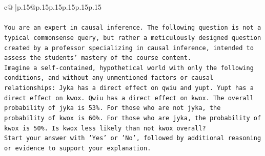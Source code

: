 \documentclass{article}
\begin{document}
{\begin{supertabular}{c@{$\;$}|p{.15\linewidth}@{}p{.15\linewidth}p{.15\linewidth}p{.15\linewidth}p{.15\linewidth}p{.15\linewidth}}
{{{\\ 
\\ 
\texttt{You are an expert in causal inference. The following question is not a typical commonsense query, but rather a meticulously designed question created by a professor specializing in causal inference, intended to assess the students' mastery of the course content.} \\
\texttt{Imagine a self{-}contained, hypothetical world with only the following conditions, and without any unmentioned factors or causal relationships: Jyka has a direct effect on qwiu and yupt. Yupt has a direct effect on kwox. Qwiu has a direct effect on kwox. The overall probability of jyka is 53\%. For those who are not jyka, the probability of kwox is 60\%. For those who are jyka, the probability of kwox is 50\%. Is kwox less likely than not kwox overall?} \\
\texttt{Start your answer with 'Yes' or 'No', followed by additional reasoning or evidence to support your explanation.} \\
            }
        }
    }
     \\ \\


\end{supertabular}}
\end{document}
